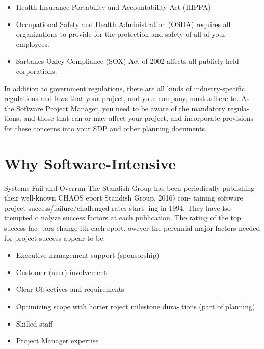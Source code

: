 \documentclass{book}
\begin{document}
\begin{multicols}{2}
\begin{itemize}
	\renewcommand{\labelitemi}{\scriptsize$\blacksquare$}
	\item Health Insurance Portability and Accountability Act
	(HIPPA).
	\item Occupational Safety and Health Administration
	(OSHA) requires all organizations to provide for the
	protection and safety of all of your employees.
	\item Sarbanes-Oxley Compliance (SOX) Act of 2002 affects
	all publicly held corporations.
\end{itemize}

In addition to government regulations, there are all kinds
of industry-specific regulations and laws that your project,
and your company, must adhere to. As the Software Project
Manager, you need to be aware of the mandatory regula-
tions, and those that can or may affect your project, and
incorporate provisions for these concerns into your SDP and
other planning documents.

\section{Why Software-Intensive}
Systems Fail and Overrun
The Standish Group has been periodically publishing their
well-known CHAOS eport Standish Group, 2016) con-
taining software project success/failure/challenged rates start-
ing in 1994. They have lso ttempted o nalyze success
factors at each publication. The rating of the top success fac-
tors change ith each eport. owever the perennial major
factors needed for project success appear to be:

\begin{itemize}
	\renewcommand{\labelitemi}{\scriptsize$\blacksquare$}
	\item Executive management support (sponsorship)
	\item Customer (user) involvement
	\item Clear Objectives and requirements
	\item Optimizing scope with horter roject milestone dura-
	tions (part of planning)
	\item Skilled staff
	\item Project Manager expertise
\end{itemize}


\end{multicols}
\end{document}
